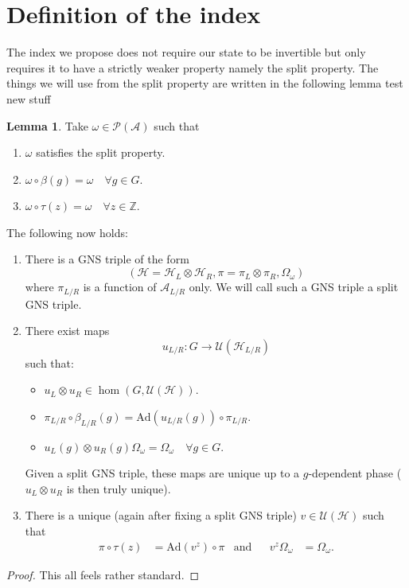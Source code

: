 \documentclass[12pt,a4paper,twoside]{article}
\newcommand{\UU}{\mathcal U}
\newcommand{\PP}{\mathcal P}
\newcommand{\HH}{\mathcal H}
\newcommand{\ZZ}{\mathbb Z}
\renewcommand{\AA}{\mathcal A}
\newcommand{\Ad}{\textrm{Ad}}
\theoremstyle{definition}
\newtheorem{lemma}[theorem]{Lemma}
\numberwithin{equation}{section}
\begin{document}
\section{Definition of the index}
The index we propose does not require our state to be invertible but only requires it to have a strictly weaker property namely the split property. The things we will use from the split property are written in the following lemma test new stuff
\begin{lemma}
	Take $\omega\in\PP(\AA)$ such that
	\begin{enumerate}
		\item $\omega$ satisfies the split property.
		\item $\omega\circ\beta(g)=\omega\quad\forall g\in G$.
		\item $\omega\circ\tau(z)=\omega\quad\forall z\in\ZZ$.
	\end{enumerate}
	The following now holds:
	\begin{enumerate}
		\item There is a GNS triple of the form
		\begin{equation}
			(\HH=\HH_L\otimes\HH_R,\pi=\pi_L\otimes\pi_R,\Omega_\omega)
		\end{equation}
		where $\pi_{L/R}$ is a function of $\AA_{L/R}$ only. We will call such a GNS triple a split GNS triple.
		\item There exist maps
		\begin{equation}
			u_{L/R}:G\rightarrow\UU(\HH_{L/R})
		\end{equation}
		such that:
		\begin{itemize}
			\item $u_L\otimes u_R\in\hom(G,\UU(\HH))$.
			\item $\pi_{L/R}\circ \beta_{L/R}(g)=\Ad(u_{L/R}(g))\circ\pi_{L/R}$.
			\item $u_L(g)\otimes u_R(g)\Omega_\omega=\Omega_\omega\quad\forall g\in G$.
		\end{itemize}
		Given a split GNS triple, these maps are unique up to a $g$-dependent phase ($u_L\otimes u_R$ is then truly unique).
		\item There is a unique (again after fixing a split GNS triple) $v\in\UU(\HH)$ such that
		\begin{align}
			\pi\circ\tau(z)&=\Ad(v^z)\circ\pi&\text{and}&&v^z\Omega_\omega&=\Omega_\omega.
		\end{align}
	\end{enumerate}
\end{lemma}
\begin{proof}
	This all feels rather standard.
\end{proof}
\end{document}
